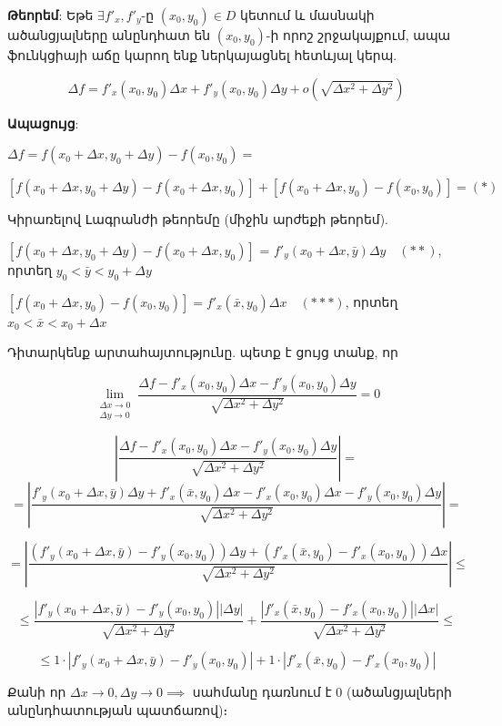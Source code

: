 \documentclass[12pt, a4paper]{article}
\begin{document}
\textbf{Թեորեմ}: Եթե $\exists f'_x, f'_y$-ը $(x_0, y_0) \in D$ կետում և մասնակի ածանցյալները անընդհատ են $(x_0, y_0)$-ի որոշ շրջակայքում, ապա ֆունկցիայի աճը կարող ենք ներկայացնել հետևյալ կերպ.

$$\Delta f = f'_x(x_0, y_0)\Delta x + f'_y(x_0, y_0)\Delta y + o(\sqrt{\Delta x^2 + \Delta y^2})$$

\textbf{Ապացույց}:

$\Delta f = f(x_0 + \Delta x, y_0 + \Delta y) - f(x_0, y_0) =$

$\left[ f(x_0 + \Delta x, y_0 + \Delta y) - f(x_0 + \Delta x, y_0) \right] + \left[ f(x_0 + \Delta x, y_0) - f(x_0, y_0) \right] = (*)$

Կիրառելով Լագրանժի թեորեմը (միջին արժեքի թեորեմ).

$\left[ f(x_0 + \Delta x, y_0 + \Delta y) - f(x_0 + \Delta x, y_0) \right]$ = $f'_y(x_0 + \Delta x, \bar{y}) \Delta y \quad (**)$, որտեղ $y_0 < \bar{y} < y_0 + \Delta y$

$\left[ f(x_0 + \Delta x, y_0) - f(x_0, y_0) \right] = f'_x(\bar{x}, y_0) \Delta x \quad (***)$, որտեղ $x_0 < \bar{x} < x_0 + \Delta x$

Դիտարկենք արտահայտությունը. պետք է ցույց տանք, որ

$$\lim_{\substack{\Delta x \to 0 \\ \Delta y \to 0}} \frac{\Delta f - f'_x(x_0, y_0)\Delta x - f'_y(x_0, y_0)\Delta y}{\sqrt{\Delta x^2 + \Delta y^2}} = 0$$

$$\left| \frac{\Delta f - f'_x(x_0, y_0)\Delta x - f'_y(x_0, y_0)\Delta y}{\sqrt{\Delta x^2 + \Delta y^2}} \right| =$$
$$= \left| \frac{f'_y(x_0 + \Delta x, \bar{y})\Delta y + f'_x(\bar{x}, y_0)\Delta x - f'_x(x_0, y_0)\Delta x - f'_y(x_0, y_0)\Delta y}{\sqrt{\Delta x^2 + \Delta y^2}} \right| =$$

$$= \left| \frac{(f'_y(x_0 + \Delta x, \bar{y}) - f'_y(x_0, y_0))\Delta y + (f'_x(\bar{x}, y_0) - f'_x(x_0, y_0))\Delta x}{\sqrt{\Delta x^2 + \Delta y^2}} \right| \le$$

$$\le \frac{|f'_y(x_0 + \Delta x, \bar{y}) - f'_y(x_0, y_0)| |\Delta y|}{\sqrt{\Delta x^2 + \Delta y^2}} + \frac{|f'_x(\bar{x}, y_0) - f'_x(x_0, y_0)| |\Delta x|}{\sqrt{\Delta x^2 + \Delta y^2}}\le$$

$$\le 1 \cdot |f'_y(x_0 + \Delta x, \bar{y}) - f'_y(x_0, y_0)| + 1 \cdot |f'_x(\bar{x}, y_0) - f'_x(x_0, y_0)|$$

Քանի որ $\Delta x \to 0, \Delta y \to 0 \implies$ սահմանը դառնում է $0$ (ածանցյալների անընդհատության պատճառով)։
\end{document}
